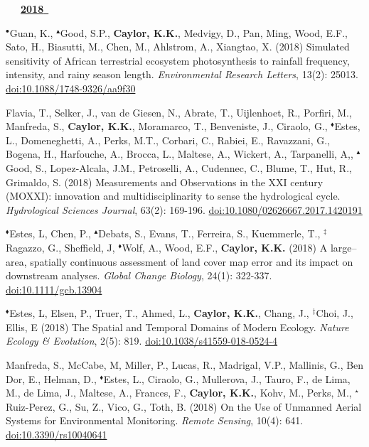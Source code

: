 \begin{etaremune}
\vspace{0.1in}
\mbox{\ \ \ \underline{\textbf{2018 }}}
\vspace{0.1in}

\item $^{\bullet}$Guan, K., $^{\blacktriangle}$Good, S.P., \textbf{ Caylor, K.K.}, Medvigy, D., Pan, Ming, Wood, E.F., Sato, H., Biasutti, M., Chen, M., Ahlstrom, A., Xiangtao, X. (2018) Simulated sensitivity of African terrestrial ecosystem photosynthesis to rainfall frequency, intensity, and rainy season length. \emph{Environmental Research Letters}, 13(2): 25013. \href{https://doi.org/10.1088/1748-9326/aa9f30}{doi:10.1088/1748-9326/aa9f30}
\item Flavia, T., Selker, J., van de Giesen, N., Abrate, T., Uijlenhoet, R., Porfiri, M., Manfreda, S., \textbf{ Caylor, K.K.}, Moramarco, T., Benveniste, J., Ciraolo, G., $^{\blacklozenge}$Estes, L., Domeneghetti, A., Perks, M.T., Corbari, C., Rabiei, E., Ravazzani, G., Bogena, H., Harfouche, A., Brocca, L., Maltese, A., Wickert, A., Tarpanelli, A,, $^{\blacktriangle}$Good, S., Lopez-Alcala, J.M., Petroselli, A., Cudennec, C., Blume, T., Hut, R., Grimaldo, S. (2018) Measurements and Observations in the XXI century (MOXXI): innovation and multidisciplinarity to sense the hydrological cycle. \emph{Hydrological Sciences Journal}, 63(2): 169-196. \href{https://doi.org/10.1080/02626667.2017.1420191}{doi:10.1080/02626667.2017.1420191}
\item $^{\blacklozenge}$Estes, L, Chen, P., $^{\blacktriangle}$Debats, S., Evans, T., Ferreira, S., Kuemmerle, T., $^{\ddagger}$Ragazzo, G., Sheffield, J, $^{\blacklozenge}$Wolf, A., Wood, E.F., \textbf{ Caylor, K.K.} (2018) A large--area, spatially continuous assessment of land cover map error and its impact on downstream analyses. \emph{Global Change Biology}, 24(1): 322-337. \href{https://doi.org/10.1111/gcb.13904}{doi:10.1111/gcb.13904}
\item $^{\blacklozenge}$Estes, L, Elsen, P., Truer, T., Ahmed, L., \textbf{ Caylor, K.K.}, Chang, J., $^{\ddagger}$Choi, J., Ellis, E (2018) The Spatial and Temporal Domains of Modern Ecology. \emph{Nature Ecology \& Evolution}, 2(5): 819. \href{https://doi.org/10.1038/s41559-018-0524-4}{doi:10.1038/s41559-018-0524-4}
\item Manfreda, S., McCabe, M, Miller, P., Lucas, R., Madrigal, V.P., Mallinis, G., Ben Dor, E., Helman, D., $^{\blacklozenge}$Estes, L., Ciraolo, G., Mullerova, J., Tauro, F., de Lima, M., de Lima, J., Maltese, A., Frances, F., \textbf{ Caylor, K.K.}, Kohv, M., Perks, M., $^{\star}$Ruiz-Perez, G., Su, Z., Vico, G., Toth, B. (2018) On the Use of Unmanned Aerial Systems for Environmental Monitoring. \emph{Remote Sensing}, 10(4): 641. \href{https://doi.org/10.3390/rs10040641}{doi:10.3390/rs10040641}

\end{etaremune}
